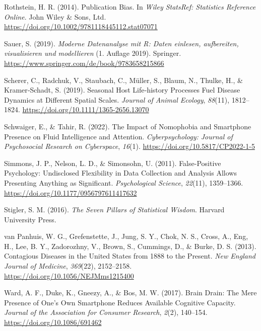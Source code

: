 \documentclass[
  letterpaper,
]{scrbook}
\newlength{\cslhangindent}
\newenvironment{CSLReferences}[2] %
 {\begin{list}{}{%
  \setlength{\itemindent}{0pt}
  \setlength{\leftmargin}{0pt}
  \setlength{\parsep}{0pt}
  \ifodd #1
   \setlength{\leftmargin}{\cslhangindent}
   \setlength{\itemindent}{-1\cslhangindent}
  \fi
  \setlength{\itemsep}{#2\baselineskip}}}
 {\end{list}}
\theoremstyle{definition}
\theoremstyle{definition}
\theoremstyle{definition}
\theoremstyle{remark}
\begin{document}
\begin{CSLReferences}{1}{0}
Rothstein, H. R. (2014). Publication {Bias}. In \emph{Wiley {StatsRef}:
{Statistics Reference Online}}. John Wiley \& Sons, Ltd.
\url{https://doi.org/10.1002/9781118445112.stat07071}

Sauer, S. (2019). \emph{Moderne Datenanalyse mit R: Daten einlesen,
aufbereiten, visualisieren und modellieren} (1. Auflage 2019). Springer.
\url{https://www.springer.com/de/book/9783658215866}

Scherer, C., Radchuk, V., Staubach, C., Müller, S., Blaum, N., Thulke,
H., \& Kramer‐Schadt, S. (2019). Seasonal Host Life‐history Processes
Fuel Disease Dynamics at Different Spatial Scales. \emph{Journal of
Animal Ecology}, \emph{88}(11), 1812--1824.
\url{https://doi.org/10.1111/1365-2656.13070}

Schwaiger, E., \& Tahir, R. (2022). The Impact of Nomophobia and
Smartphone Presence on Fluid Intelligence and Attention.
\emph{Cyberpsychology: Journal of Psychosocial Research on Cyberspace},
\emph{16}(1). \url{https://doi.org/10.5817/CP2022-1-5}

Simmons, J. P., Nelson, L. D., \& Simonsohn, U. (2011). False-{Positive
Psychology}: {Undisclosed Flexibility} in {Data Collection} and
{Analysis Allows Presenting Anything} as {Significant}.
\emph{Psychological Science}, \emph{22}(11), 1359--1366.
\url{https://doi.org/10.1177/0956797611417632}

Stigler, S. M. (2016). \emph{The Seven Pillars of Statistical Wisdom}.
Harvard University Press.

van Panhuis, W. G., Grefenstette, J., Jung, S. Y., Chok, N. S., Cross,
A., Eng, H., Lee, B. Y., Zadorozhny, V., Brown, S., Cummings, D., \&
Burke, D. S. (2013). Contagious {Diseases} in the {United States} from
1888 to the {Present}. \emph{New England Journal of Medicine},
\emph{369}(22), 2152--2158. \url{https://doi.org/10.1056/NEJMms1215400}

Ward, A. F., Duke, K., Gneezy, A., \& Bos, M. W. (2017). Brain {Drain}:
{The Mere Presence} of {One}'s {Own Smartphone Reduces Available
Cognitive Capacity}. \emph{Journal of the Association for Consumer
Research}, \emph{2}(2), 140--154. \url{https://doi.org/10.1086/691462}


\end{CSLReferences}
\end{document}
